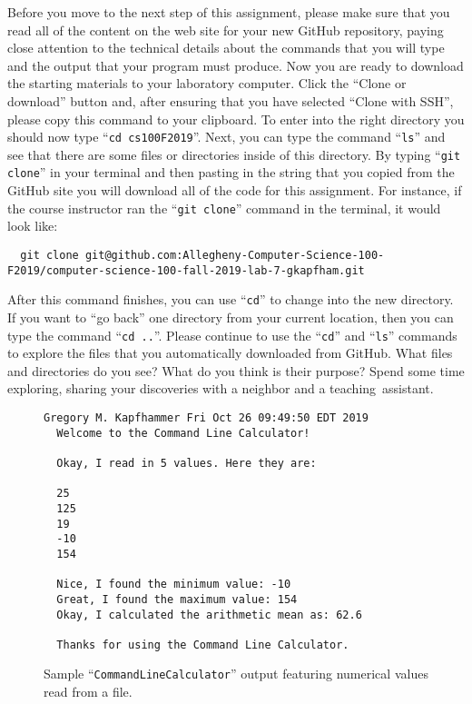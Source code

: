 \documentclass[11pt]{article}
\newcommand{\command}[1]{``\lstinline{#1}''}
\newcommand{\step}[1]{``{#1}''}
\begin{document}
Before you move to the next step of this assignment, please make sure that you
read all of the content on the web site for your new GitHub repository, paying
close attention to the technical details about the commands that you will type
and the output that your program must produce. Now you are ready to download the
starting materials to your laboratory computer. Click the ``Clone or download''
button and, after ensuring that you have selected ``Clone with SSH'', please
copy this command to your clipboard. To enter into the right directory you
should now type \command{cd cs100F2019}. Next, you can type the command
\command{ls} and see that there are some files or directories inside of this
directory. By typing \command{git clone} in your terminal and then pasting in
the string that you copied from the GitHub site you will download all of the
code for this assignment. For instance, if the course instructor ran the
\command{git clone} command in the terminal, it would look like:

\begin{lstlisting}
  git clone git@github.com:Allegheny-Computer-Science-100-F2019/computer-science-100-fall-2019-lab-7-gkapfham.git
\end{lstlisting}

After this command finishes, you can use \command{cd} to change into the new
directory. If you want to \step{go back} one directory from your current
location, then you can type the command \command{cd ..}. Please continue to use
the \command{cd} and \command{ls} commands to explore the files that you
automatically downloaded from GitHub. What files and directories do you see?
What do you think is their purpose? Spend some time exploring, sharing your
discoveries with a neighbor and a \mbox{teaching assistant}.

\begin{figure}[tb]
\begin{Verbatim}[commandchars=\\\{\}]
  Gregory M. Kapfhammer Fri Oct 26 09:49:50 EDT 2019
  Welcome to the Command Line Calculator!

  Okay, I read in 5 values. Here they are:

  25
  125
  19
  -10
  154

  Nice, I found the minimum value: -10
  Great, I found the maximum value: 154
  Okay, I calculated the arithmetic mean as: 62.6

  Thanks for using the Command Line Calculator.
\end{Verbatim}
\vspace*{-.1in}
\caption{Sample ``{\tt CommandLineCalculator}'' output featuring numerical values read from a file.}
\label{fig:output}
\end{figure}
\end{document}
